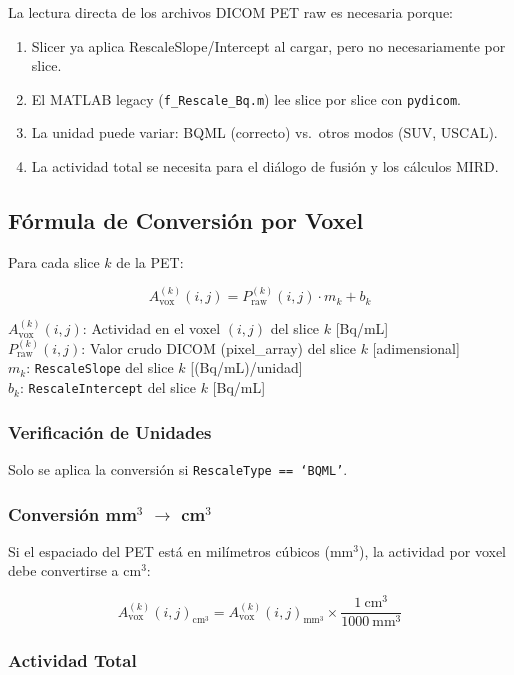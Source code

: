 \documentclass[12pt,a4paper]{article}
\newcommand{\vardef}[2]{\noindent\textbf{#1}: #2\\}
\begin{document}
La lectura directa de los archivos DICOM PET raw es necesaria porque:
\begin{enumerate}
  \item Slicer ya aplica RescaleSlope/Intercept al cargar, pero no necesariamente por slice.
  \item El MATLAB legacy (\texttt{f\_Rescale\_Bq.m}) lee slice por slice con \texttt{pydicom}.
  \item La unidad puede variar: BQML (correcto) vs.\ otros modos (SUV, USCAL).
  \item La actividad total se necesita para el diálogo de fusión y los cálculos MIRD.
\end{enumerate}

\subsection{Fórmula de Conversión por Voxel}

Para cada slice $k$ de la PET:

$$A_{\text{vox}}^{(k)}(i,j) = P_{\text{raw}}^{(k)}(i,j) \cdot m_k + b_k$$

\vardef{$A_{\text{vox}}^{(k)}(i,j)$}{Actividad en el voxel $(i,j)$ del slice $k$ [Bq/mL]}
\vardef{$P_{\text{raw}}^{(k)}(i,j)$}{Valor crudo DICOM (pixel\_array) del slice $k$ [adimensional]}
\vardef{$m_k$}{\texttt{RescaleSlope} del slice $k$ [(Bq/mL)/unidad]}
\vardef{$b_k$}{\texttt{RescaleIntercept} del slice $k$ [Bq/mL]}

\subsubsection{Verificación de Unidades}

Solo se aplica la conversión si \texttt{RescaleType == `BQML'}.

\subsubsection{Conversión mm$^3$ $\to$ cm$^3$}

Si el espaciado del PET está en milímetros cúbicos (mm$^3$), la actividad por voxel debe convertirse a cm$^3$:

$$A_{\text{vox}}^{(k)}(i,j)_{\text{cm}^3} = A_{\text{vox}}^{(k)}(i,j)_{\text{mm}^3} \times \frac{1\ \text{cm}^3}{1000\ \text{mm}^3}$$

\subsubsection{Actividad Total}
\end{document}
